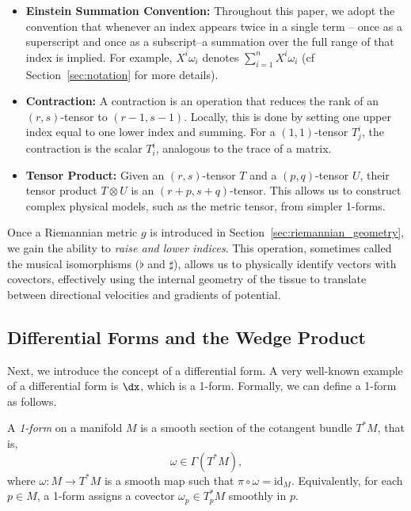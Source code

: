 \begin{itemize}
  \item \textbf{Einstein Summation Convention:} Throughout this paper, we adopt the convention that whenever an index appears twice in a single term -- once as a superscript and once as a subscript--a summation over the full range of that index is implied. For example, $X^i \omega_i$ denotes $\sum_{i=1}^n X^i \omega_i$ (cf Section~\ref{sec:notation} for more details).

  \item \textbf{Contraction:} A contraction is an operation that reduces the rank of an $(r,s)$-tensor to $(r-1, s-1)$. Locally, this is done by setting one upper index equal to one lower index and summing. For a $(1,1)$-tensor $T^i_j$, the contraction is the scalar $T^i_i$, analogous to the trace of a matrix.

  \item \textbf{Tensor Product:} Given an $(r,s)$-tensor $T$ and a $(p,q)$-tensor $U$, their tensor product $T \otimes U$ is an $(r+p, s+q)$-tensor. This allows us to construct complex physical models, such as the metric tensor, from simpler 1-forms.
\end{itemize}

\begin{note}
  Once a Riemannian metric $g$ is introduced in Section~\ref{sec:riemannian_geometry}, we gain the ability to \emph{raise and lower indices}. This operation, sometimes called the musical isomorphisms ($\flat$ and $\sharp$), allows us to physically identify vectors with covectors, effectively using the internal geometry of the tissue to translate between directional velocities and gradients of potential.
\end{note}

\subsection{Differential Forms and the Wedge Product} Next, we introduce the concept of a differential form. A very well-known example of a differential form is $\dx$, which is a 1-form. Formally, we can define a 1-form as follows.

\begin{definition}
  A \emph{1-form} on a manifold $M$ is a smooth section of the cotangent bundle $T^*M$, that is,
  \[%
    \omega \in \Gamma(T^*M)
  ,\]%
  where $\omega : M \to T^*M$ is a smooth map such that $\pi \circ \omega = \mathrm{id}_M$. Equivalently, for each $p \in M$, a 1-form assigns a covector $\omega_p \in T_p^*M$ smoothly in $p$.
\end{definition}

